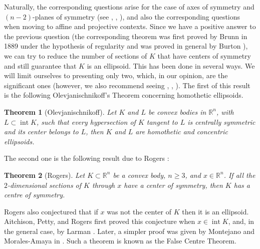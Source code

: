 \documentclass[12pt]{amsart}
\newcommand{\inte}{\operatorname*{int}}
\newcommand{\Rn}{\mathbb{R}^{n}}
\newtheorem{theorem}{Theorem}
\begin{document}
                     Naturally, the corresponding questions arise for the case of axes of symmetry and 
                     $(n-2)$-planes of symmetry (see \cite{mo}, \cite{gmm}, \cite{alfonseca}), and also 
                     the corresponding questions when mo\-ving to 
                     affine and projective contexts. Since we have a positive answer to the previous 
                     question (the corresponding theorem was first proved by Brunn \cite{Brunn} in 1889 under 
                     the hypothesis of regularity and was proved in general by Burton \cite{Burton}), 
                     we can try to 
                     reduce the number of sections of $K$ that have centers of 
                     symmetry and still guarantee that $K$ is an ellipsoid. This has been done in several 
                     ways. We will limit ourselves to presenting only two, which, in our opinion, are the 
                     significant ones (however, we also recommend seeing \cite{BG}, \cite{mm3}, 
                     \cite{LMM}). The first of this result is the following Olevjanischnikoff's 
                     Theorem \cite{Ol2} concerning homothetic ellipsoids.

\begin{theorem}[Olevjanischnikoff] \label{thmOle}
                     Let $K$ and $L$ be convex bodies in $\Rn$, with $L\subset \inte K$, such that every 
                     hypersection of $K$ tangent to $L$ is centrally symmetric and its center belongs to 
                     $\mbox{} L$, then $K$ and $L$ are homothetic and concentric ellipsoids.
\end{theorem}

                    The second one is the following result due to Rogers \cite{Rogers}: 

 
\begin{theorem}[Rogers]
                    Let $K\subset\mathbb R^n$ be a convex body, $n\geq 3$, and 
                    $x\in\mathbb R^n$. If all the $2$-dimensional sections of $K$ through $x$ have a 
                    center of symmetry, then $K$ has a centre of symmetry.
\end{theorem}
                    Rogers also conjectured that if $x$ was not the center of $K$ then it is an ellipsoid. 
                    Aitchison, Petty, and Rogers first proved this conjecture \cite{false_centre} 
                    when $x \in \inte K$, and, in the general case, by Larman  \cite{larman}. Later, a simpler 
                    proof was given by Montejano and Morales-Amaya in \cite{Falso_MM}. Such a theorem 
                    is known as the False Centre Theorem.
\end{document}
